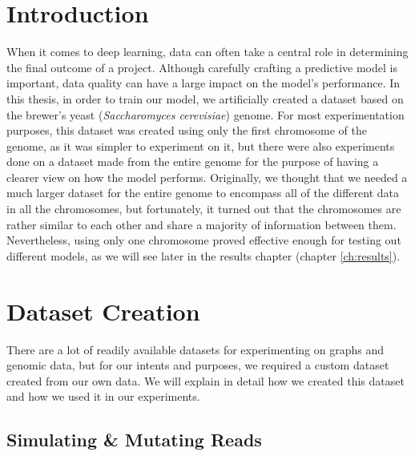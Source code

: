 \documentclass[times, utf8, diplomski, english]{fer_eng}
\begin{document}
\section{Introduction}
\label{sec:introduction}

When it comes to deep learning, data can often take a central role in determining the final outcome of a project. Although carefully crafting a predictive model is important, data quality can have a large impact on the model's performance. In this thesis, in order to train our model, we artificially created a dataset based on the brewer's yeast (\textit{Saccharomyces cerevisiae}) genome. For most experimentation purposes, this dataset was created using only the first chromosome of the genome, as it was simpler to experiment on it, but there were also experiments done on a dataset made from the entire genome for the purpose of having a clearer view on how the model performs. Originally, we thought that we needed a much larger dataset for the entire genome to encompass all of the different data in all the chromosomes, but fortunately, it turned out that the chromosomes are rather similar to each other and share a majority of information between them. Nevertheless, using only one chromosome proved effective enough for testing out different models, as we will see later in the results chapter (chapter \ref{ch:results}).

\section{Dataset Creation}
\label{sec:dataset creation}

There are a lot of readily available datasets for experimenting on graphs and genomic data, but for our intents and purposes, we required a custom dataset created from our own data. We will explain in detail how we created this dataset and how we used it in our experiments.

\subsection{Simulating \& Mutating Reads}
\end{document}
